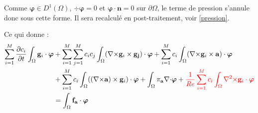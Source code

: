 \begin{rk}
Comme $\bm{\varphi}\in D^1(\Omega)$, $\div\bm{\varphi}=0$ et $\bm{\varphi}\cdot \mathbf{n}=0$ sur $\partial\Omega$, le terme de pression s'annule donc sous cette forme. Il sera recalculé en post-traitement, voir \ref{pression}.\\
\end{rk}
Ce qui donne :
\begin{align*}
\sum_{i=1}^M\frac{\partial c_i}{\partial t}\int_\Omega\mathbf{g}_i\cdot\bm{\varphi} &+ \sum_{i=1}^M\sum_{j=1}^Mc_ic_j\int_\Omega({\nabla\times}\mathbf{g}_i\times \mathbf{g_j})\cdot\bm{\varphi} + \sum_{i=1}^Mc_i\int_\Omega({\nabla\times}\mathbf{g}_i\times \mathbf{a})\cdot\bm{\varphi}\\
& +  \sum_{i=1}^Mc_i\int_\Omega(({\nabla\times}\mathbf{a})\times \mathbf{g}_i)\cdot\bm{\varphi} + \int_\Omega\pi_{\mathbf{a}}{\nabla\cdot}\bm{\varphi} + \textcolor{red}{\frac{1}{Re}\sum_{i=1}^Mc_i\int_\Omega{\nabla^2\times}\mathbf{g}_i\cdot\bm{\varphi}}\\
& = \int_\Omega\mathbf{f_a}\cdot\bm{\varphi}\\
\end{align*}

